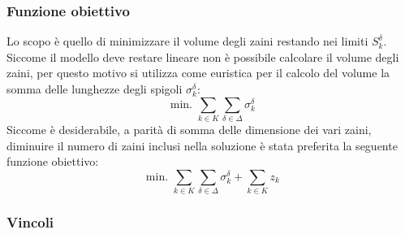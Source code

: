 \documentclass{scrartcl}
\begin{document}
\subsubsection{Funzione obiettivo}
Lo scopo è quello di minimizzare il volume degli zaini restando nei limiti $S_k^\delta$. Siccome il modello deve restare lineare non è possibile calcolare il volume degli zaini, per questo motivo si utilizza come euristica per il calcolo del volume la somma delle lunghezze degli spigoli $\sigma_k^\delta$:
\begin{equation}
\text{ min. } \sum_{k \in K} \sum_{\delta \in \Delta} \sigma_k^\delta
\end{equation}
Siccome è desiderabile, a parità di somma delle dimensione dei vari zaini, diminuire il numero di zaini inclusi nella soluzione è stata preferita la seguente funzione obiettivo:
\begin{equation}
\text{ min. } \sum_{k \in K} \sum_{\delta \in \Delta} \sigma_k^\delta + \sum_{k \in K} z_k
\end{equation}
\subsubsection{Vincoli}
\end{document}
